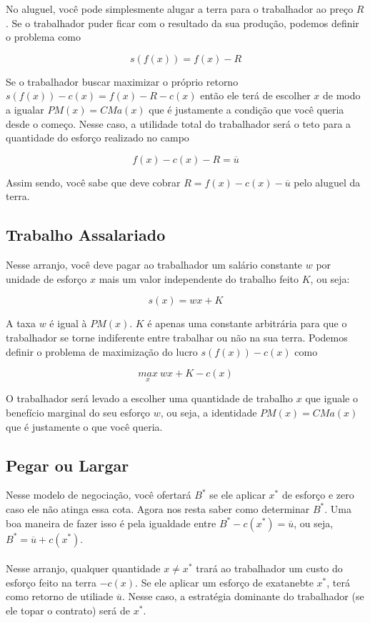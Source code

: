 \documentclass[a4paper,11pt,oneside]{book}
\theoremstyle{definition}
\theoremstyle{break}
\begin{document}
No aluguel, você pode simplesmente alugar a terra para o trabalhador ao preço $R$. Se o trabalhador puder ficar com o resultado da sua produção, podemos definir o problema como

$$ s(f(x)) = f(x) - R $$

Se o trabalhador buscar maximizar o próprio retorno $s(f(x)) - c(x) = f(x) - R - c(x)$ então ele terá de escolher $x$ de modo a igualar $PM(x) = CMa(x)$ que é justamente a condição que você queria desde o começo. Nesse caso, a utilidade total do trabalhador será o teto para a quantidade do esforço realizado no campo

$$ f(x) - c(x) - R = \overline{u} $$

Assim sendo, você sabe que deve cobrar $R = f(x) - c(x) - \overline{u}$ pelo aluguel da terra.

\subsection*{Trabalho Assalariado}

Nesse arranjo, você deve pagar ao trabalhador um salário constante $w$ por unidade de esforço $x$ mais um valor independente do trabalho feito $K$, ou seja:

$$ s(x) = wx + K $$

A taxa $w$ é igual à $PM(x)$. $K$ é apenas uma constante arbitrária para que o trabalhador se torne indiferente entre trabalhar ou não na sua terra. Podemos definir o problema de maximização do lucro $s(f(x)) - c(x)$ como

$$ \underset{x}{max} \ wx + K - c(x) $$

O trabalhador será levado a escolher uma quantidade de trabalho $x$ que iguale o benefício marginal do seu esforço $w$, ou seja, a identidade $PM(x) = CMa(x)$ que é justamente o que você queria.

\subsection*{Pegar ou Largar}

Nesse modelo de negociação, você ofertará $B^*$ se ele aplicar $x^*$ de esforço e zero caso ele não atinga essa cota. Agora nos resta saber como determinar $B^*$. Uma boa maneira de fazer isso é pela igualdade entre $B^* - c(x^*) = \overline{u} $, ou seja, $B^* = \overline{u} + c(x^*)$.
\\~\\
Nesse arranjo, qualquer quantidade $x \neq x^*$ trará ao trabalhador um custo do esforço feito na terra $-c(x)$. Se ele aplicar um esforço de exatanebte $x^*$, terá como retorno de utiliade $\overline{u}$. Nesse caso, a estratégia dominante do trabalhador (se ele topar o contrato) será de $x^*$.
\end{document}
